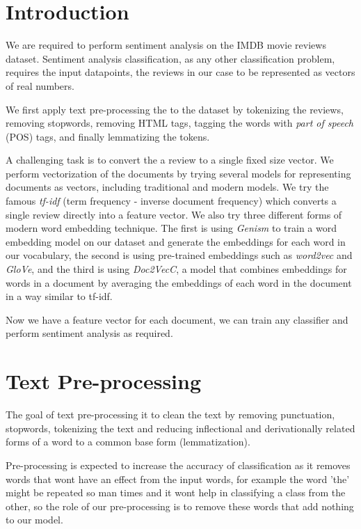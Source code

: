 \documentclass{article}
\begin{document}
	
	
	\section{Introduction}
	
	We are required to perform sentiment analysis on the IMDB movie reviews dataset. Sentiment analysis classification, as any other classification problem, requires the input datapoints, the reviews in our case to be represented as vectors of real numbers. 
	
	We first apply text pre-processing the to the dataset by tokenizing the reviews, removing stopwords, removing HTML tags, tagging the words with \textit{part of speech} (POS) tags, and finally lemmatizing the tokens.
	
	A challenging task is to convert the a review to a single fixed size vector. We perform vectorization of the documents by trying several models for representing documents as vectors, including traditional and modern models. We try the famous \textit{tf-idf} (term frequency - inverse document frequency) which converts a single review directly into a feature vector. We also try three different forms of modern word embedding technique. The first is using \textit{Genism} to train a word embedding model on our dataset and generate the embeddings for each word in our vocabulary, the second is using pre-trained embeddings such as \textit{word2vec} and \textit{GloVe}, and the third is using \textit{Doc2VecC}, a model that combines embeddings for words in a document by averaging the embeddings of each word in the document in a way similar to tf-idf.
	
	Now we have a feature vector for each document, we can train any classifier and perform sentiment analysis as required.
	
	\section{Text Pre-processing}
	
	The goal of text pre-processing it to clean the text by removing punctuation, stopwords, tokenizing the text and reducing inflectional and derivationally related forms of a word to a common base form (lemmatization).
	
	Pre-processing is expected to increase the accuracy of classification as it removes words that wont have an effect from the input words, for example the word 'the' might be repeated so man times and it wont help in classifying a class from the other, so the role of our pre-processing is to remove these words that add nothing to our model.
	
\end{document}
